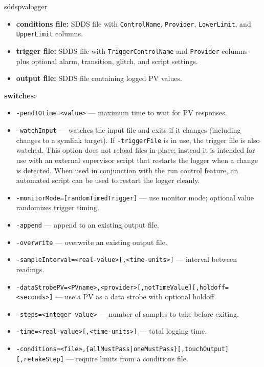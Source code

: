 \begin{sddsprog}{sddspvalogger}
\begin{itemize}
    \verb|ExpectNumeric| or the string column \verb|StorageType|. Optional
    columns include \verb|ReadbackName|, \verb|ScaleFactor|, waveform slice
    indices, \verb|Average|, and \verb|Units|.
  \item \textbf{conditions file:} SDDS file with \verb|ControlName|,
    \verb|Provider|, \verb|LowerLimit|, and \verb|UpperLimit| columns.
  \item \textbf{trigger file:} SDDS file with \verb|TriggerControlName| and
    \verb|Provider| columns plus optional alarm, transition, glitch, and script
    settings.
  \item \textbf{output file:} SDDS file containing logged PV values.
\end{itemize}

\item \textbf{switches:}
\begin{itemize}
  \item {\tt -pendIOtime=<value>} --- maximum time to wait for PV responses.
  \item {\tt -watchInput} --- watches the input file and exits if it changes (including changes to a symlink target). If \verb|-triggerFile| is in use, the trigger file is also watched. This option does not reload files in-place; instead it is intended for use with an external supervisor script that restarts the logger when a change is detected. When used in conjunction with the run control feature, an automated script can be used to restart the logger cleanly.
  \item {\tt -monitorMode=[randomTimedTrigger]} --- use monitor mode; optional value randomizes trigger timing.
  \item {\tt -append} --- append to an existing output file.
  \item {\tt -overwrite} --- overwrite an existing output file.
  \item {\tt -sampleInterval=<real-value>[,<time-units>]} --- interval between readings.
  \item {\tt -dataStrobePV=<PVname>,<provider>[,notTimeValue][,holdoff=<seconds>]} --- use a PV as a data strobe with optional holdoff.
  \item {\tt -steps=<integer-value>} --- number of samples to take before exiting.
  \item {\tt -time=<real-value>[,<time-units>]} --- total logging time.
  \item {\tt -conditions=<file>,\{allMustPass|oneMustPass\}[,touchOutput][,retakeStep]} --- require limits from a conditions file.

\end{itemize}
\end{sddsprog}
